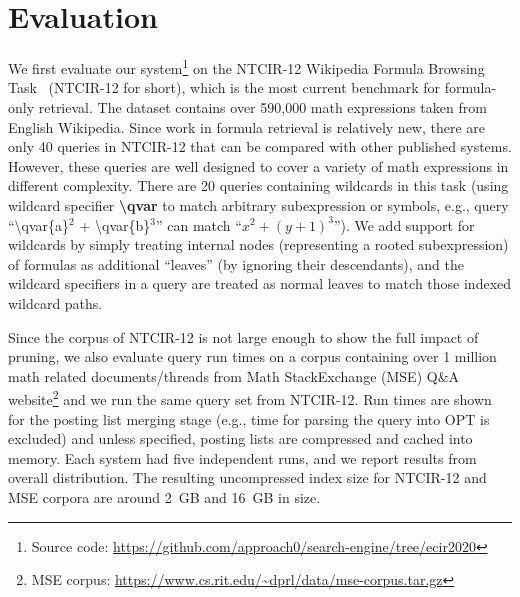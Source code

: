 \documentclass[runningheads]{llncs}
\begin{document}
\section{Evaluation}
We first evaluate our system\footnote{Source code: \url{https://github.com/approach0/search-engine/tree/ecir2020}} on the NTCIR-12 Wikipedia Formula Browsing Task~\cite{ntcir12} (NTCIR-12 for short), which is the most current benchmark for formula-only retrieval.
The dataset contains over 590,000 math expressions taken from English Wikipedia.
%
Since work in formula retrieval is relatively new, there are only 40 queries in NTCIR-12 that can be compared with other published systems. However, these queries are well designed to cover a variety of math expressions in different complexity.
There are 20 queries containing wildcards in this task (using wildcard specifier \textbf{\textbackslash{}qvar} to match arbitrary subexpression or symbols, e.g., query ``\textbackslash qvar\{a\}$^2$ + \textbackslash qvar\{b\}$^3$'' can match ``$x^2 + (y + 1)^3$'').
%
We add support for wildcards by simply treating internal nodes (representing a rooted subexpression) of formulas as additional ``leaves'' (by ignoring their descendants), and the wildcard specifiers in a query are treated as normal leaves to match those indexed wildcard paths.

Since the corpus of NTCIR-12 is not large enough to show the full impact of pruning, we also evaluate query run times on a corpus containing over 1 million math related documents/threads from Math StackExchange (MSE) Q\&A website\footnote{MSE corpus: \url{https://www.cs.rit.edu/~dprl/data/mse-corpus.tar.gz}} and we run the same query set from NTCIR-12.
%
Run times are shown for the posting list merging stage (e.g., time for parsing the query into OPT is excluded) and unless specified, posting lists are compressed and cached into memory.
%
Each system had five independent runs, and we report results from overall distribution.
%
The resulting uncompressed index size for NTCIR-12 and MSE corpora are
around 2~GB and 16~GB in size.
\end{document}
